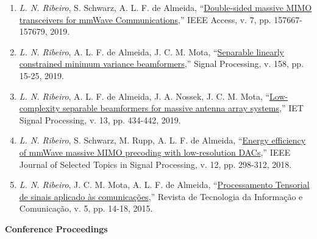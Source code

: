 \begin{enumerate}
	\item \emph{L. N. Ribeiro}, S. Schwarz, A. L. F. de Almeida, ``\href{https://doi.org/10.1109/ACCESS.2019.2949945}{Double-sided massive MIMO transceivers for mmWave Communications},'' IEEE Access, v. 7, pp. 157667-157679, 2019.
	
	\item \emph{L. N. Ribeiro}, A. L. F. de Almeida, J. C. M. Mota, ``\href{https://doi.org/10.1016/j.sigpro.2018.12.010}{Separable linearly constrained minimum variance beamformers},'' Signal Processing, v. 158, pp. 15-25, 2019.
	
	\item \emph{L. N. Ribeiro}, A. L. F. de Almeida, J. A. Nossek, J. C. M. Mota, ``\href{https://doi.org/10.1049/iet-spr.2018.5115}{Low-complexity separable beamformers for massive antenna array systems},'' IET Signal Processing, v. 13, pp. 434-442, 2019.
	
	\item \emph{L. N. Ribeiro}, S. Schwarz, M. Rupp, A. L. F. de Almeida, ``\href{https://doi.org/10.1109/JSTSP.2018.2824762}{Energy efficiency of mmWave massive MIMO precoding with low-resolution DACs},'' IEEE Journal of Selected Topics in Signal Processing, v. 12, pp. 298-312, 2018.
	
	\item \emph{L. N. Ribeiro}, J. C. M. Mota, A. L. F. de Almeida, ``\href{http://rtic.com.br/index.php/rtic/article/view/65}{Processamento Tensorial de sinais aplicado às comunicações},'' Revista de Tecnologia da Informação e Comunicação, v. 5, pp. 14-18, 2015.
\end{enumerate}

{\bf Conference Proceedings}\\

